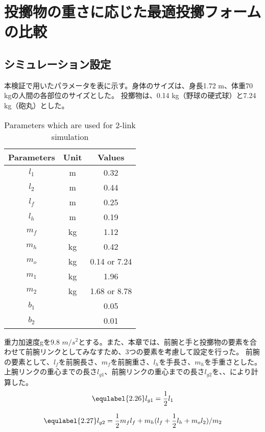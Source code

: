 \section{投擲物の重さに応じた最適投擲フォームの比較}
\subsection{シミュレーション設定}
本検証で用いたパラメータを表に示す。身体のサイズは、身長1.72 m、体重70 kgの人間の各部位のサイズとした。
投擲物は、0.14 kg（野球の硬式球）と7.24 kg（砲丸）とした。
\begin{table}[tb]
  \begin{center}
    \caption{Parameters which are used for 2-link simulation}
    
    \begin{tabular}{c|c|c}
      \hline
      Parameters & Unit & Values \\
      \hline
      $l_{1}$ & m & 0.32 \\
      $l_{2}$ & m & 0.44 \\
      $l_{f}$ & m & 0.25 \\
      $l_{h}$ & m & 0.19 \\
      $m_{f}$ & kg & 1.12 \\
      $m_{h}$ & kg & 0.42 \\
      $m_{o}$ & kg & 0.14 or 7.24 \\
      $m_{1}$ & kg & 1.96 \\
      $m_{2}$ & kg & 1.68 or 8.78 \\
      $b_{1}$ &  & 0.05 \\
      $b_{2}$ &  & 0.01 \\
      \hline
    \end{tabular}
  \end{center}
\end{table}
重力加速度gを9.8 $m/s^{2}$とする。また、本章では、前腕と手と投擲物の要素を合わせて前腕リンクとしてみなすため、3つの要素を考慮して設定を行った。
前腕の要素として、$l_{f}$を前腕長さ、$m_{f}$を前腕重さ、$l_{h}$を手長さ、$m_{h}$を手重さとした。\\
上腕リンクの重心までの長さ$l_{g1}$、前腕リンクの重心までの長さ$l_{g2}$を、、により計算した。
\begin{eqnarray}
  \equlabel{2.26}
  l_{g1}=\frac{1}{2}l_{1}
\end{eqnarray}

\begin{eqnarray}
  \equlabel{2.27}
  l_{g2}=\frac{1}{2}m_{f}l_{f}+m_{h}(l_{f}+\frac{1}{2}l_{h}+m_{o}l_{2})/m_{2}
\end{eqnarray}

